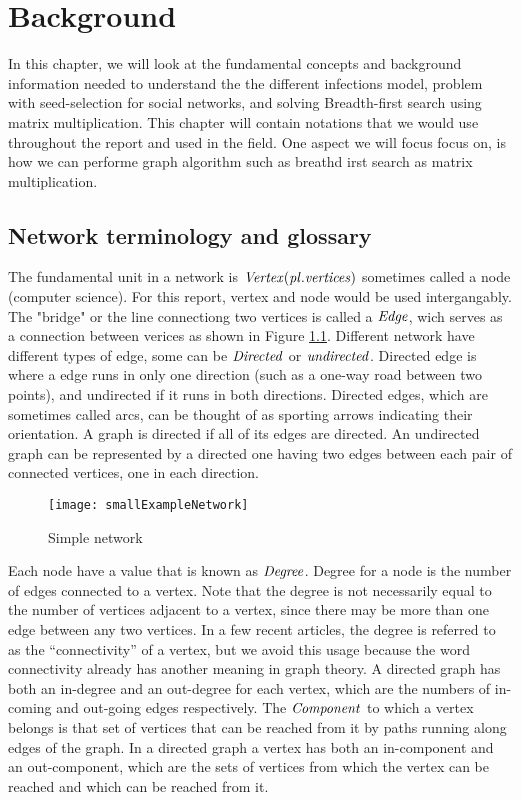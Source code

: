 \chapter{Background}

In this chapter, we will look at the fundamental concepts and background information needed to understand the the different infections model, problem with seed-selection for social networks, and solving Breadth-first search using matrix multiplication. This chapter will contain notations that we would use throughout the report and used in the field. One aspect we will focus focus on, is how we can performe graph algorithm such as breathd irst search as matrix multiplication.


\section{Network terminology and glossary}
The fundamental unit in a network is $\it{{Vertex}} (pl. vertices)$ sometimes called a node (computer science). For this report, vertex and node would be used intergangably. The "bridge" or the line connectiong two vertices is called a $\it{{Edge}}$, wich serves as a connection between verices as shown in Figure \ref{fig:SimpleGraph}.  Different network have different types of edge, some can be $\it{Directed}$ or $\it{undirected}$. Directed edge is where a edge  runs in only one direction (such as a one-way road between two points), and undirected if it runs in both directions. Directed edges, which are sometimes called arcs, can be thought of as sporting arrows indicating their orientation. A graph is directed if all of its edges are directed. An undirected graph can be represented by a directed one having two edges between each pair of connected vertices, one in each direction.

\begin{figure}[!ht]
	\caption{Simple network} 
	\label{fig:SimpleGraph}
	\texttt{[image: smallExampleNetwork]}
\end{figure}


Each node have a value that is known as $\it{{Degree}}$. Degree for a node is the number of edges connected to a vertex. Note that the degree is not necessarily equal to the number of vertices adjacent to a vertex, since there may be more than one edge between any two vertices. In a few recent articles, the degree is referred to as the “connectivity” of a vertex, but we avoid this usage because the word connectivity already has another meaning in graph theory. A directed graph has both an in-degree and an out-degree for each vertex, which are the numbers of in-coming and out-going edges respectively. The $\it{{Component}}$ to which a vertex belongs is that set of vertices that can be reached from it by paths running along edges of the graph. In a directed graph a vertex has both an in-component and an out-component, which are the sets of vertices from which the vertex can be reached and which can be reached from it.

